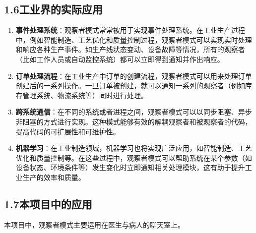 \documentclass[24pt,a4paper]{article}%
\begin{document}
\subsection*{\songti 1.6工业界的实际应用}
\begin{enumerate}
    \item \textbf{事件处理系统}：观察者模式常常被用于实现事件处理系统。在工业生产过程中，例如智能制造、工艺优化和质量控制过程，观察者模式可以实现实时处理和响应各种生产事件。如生产线状态变动、设备故障等情况，所有的观察者（比如工作人员或自动监控系统）都可以立即得到通知并作出响应。
    \item \textbf{订单处理流程}：在工业生产中订单的创建流程，观察者模式可以用来处理订单创建后的一系列操作。一旦订单被创建，就可以通知一系列的观察者（例如库存管理系统、物流系统等）同时进行处理。
    \item \textbf{跨系统通信}：在不同的系统或者进程之间，观察者模式可以以同步阻塞、异步非阻塞的方式进行实现。这种模式能够有效的解耦观察者和被观察者的代码，提高代码的可扩展性和可维护性。
    \item \textbf{机器学习}：在工业制造领域，机器学习也将实现广泛应用，如智能制造、工艺优化和质量控制等。在这些过程中，观察者模式可以帮助系统在某个参数（如设备状态、环境条件等）发生变化时立即通知相关处理模块，这有助于提升工业生产的效率和质量。
\end{enumerate}

\subsection*{\songti 1.7本项目中的应用}
本项目中，观察者模式主要运用在医生与病人的聊天室上。
\end{document}
